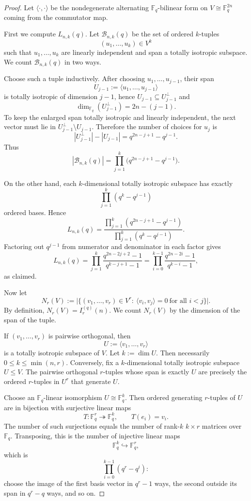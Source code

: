 \documentclass[11pt]{article}
\theoremstyle{definition}
\theoremstyle{remark}
\theoremstyle{definition}
\theoremstyle{plain}
\begin{document}
\begin{proof}
Let $\langle\cdot,\cdot\rangle$ be the nondegenerate alternating $\mathbb F_q$-bilinear form on
$V\cong \mathbb F_q^{2n}$ coming from the commutator map.

First we compute $L_{n,k}(q)$.
Let $\mathcal B_{n,k}(q)$ be the set of ordered $k$-tuples
\[
(u_1,\dots,u_k)\in V^k
\]
such that $u_1,\dots,u_k$ are linearly independent and span a totally isotropic subspace.
We count $\mathcal B_{n,k}(q)$ in two ways.

Choose such a tuple inductively.
After choosing $u_1,\dots,u_{j-1}$, their span
\[
U_{j-1}:=\langle u_1,\dots,u_{j-1}\rangle
\]
is totally isotropic of dimension $j-1$, hence $U_{j-1}\subseteq U_{j-1}^{\perp}$ and
\[
\dim_{\mathbb F_q}(U_{j-1}^{\perp})=2n-(j-1).
\]
To keep the enlarged span totally isotropic and linearly independent, the next vector must lie in
$U_{j-1}^{\perp}\setminus U_{j-1}$. Therefore the number of choices for $u_j$ is
\[
|U_{j-1}^{\perp}|-|U_{j-1}|=q^{2n-j+1}-q^{j-1}.
\]
Thus
\[
|\mathcal B_{n,k}(q)|
=
\prod_{j=1}^{k}\bigl(q^{2n-j+1}-q^{j-1}\bigr).
\]

On the other hand, each $k$-dimensional totally isotropic subspace has exactly
\[
\prod_{j=1}^{k}(q^k-q^{j-1})
\]
ordered bases. Hence
\[
L_{n,k}(q)
=
\frac{\prod_{j=1}^{k}(q^{2n-j+1}-q^{j-1})}
     {\prod_{j=1}^{k}(q^k-q^{j-1})}.
\]
Factoring out $q^{j-1}$ from numerator and denominator in each factor gives
\[
L_{n,k}(q)
=
\prod_{j=1}^{k}\frac{q^{2n-2j+2}-1}{q^{k-j+1}-1}
=
\prod_{i=0}^{k-1}\frac{q^{2n-2i}-1}{q^{k-i}-1},
\]
as claimed.

Now let
\[
N_r(V):=\bigl|\{(v_1,\dots,v_r)\in V^r:\ \langle v_i,v_j\rangle=0\ \text{for all }i<j\}\bigr|.
\]
By definition, $N_r(V)=I_r^{(q)}(n)$.
We count $N_r(V)$ by the dimension of the span of the tuple.

If $(v_1,\dots,v_r)$ is pairwise orthogonal, then
\[
U:=\langle v_1,\dots,v_r\rangle
\]
is a totally isotropic subspace of $V$.
Let $k:=\dim U$. Then necessarily $0\le k\le \min(n,r)$.
Conversely, fix a $k$-dimensional totally isotropic subspace $U\le V$.
The pairwise orthogonal $r$-tuples whose span is exactly $U$ are precisely the ordered $r$-tuples in $U^r$
that generate $U$.

Choose an $\mathbb F_q$-linear isomorphism $U\cong \mathbb F_q^k$.
Then ordered generating $r$-tuples of $U$ are in bijection with surjective linear maps
\[
T:\mathbb F_q^r\twoheadrightarrow \mathbb F_q^k,
\qquad
T(e_i)=v_i.
\]
The number of such surjections equals the number of rank-$k$ $k\times r$ matrices over $\mathbb F_q$.
Transposing, this is the number of injective linear maps
\[
\mathbb F_q^k\hookrightarrow \mathbb F_q^r,
\]
which is
\[
\prod_{i=0}^{k-1}(q^r-q^i):
\]
choose the image of the first basis vector in $q^r-1$ ways, the second outside its span in $q^r-q$ ways,
and so on.


\end{proof}
\end{document}
